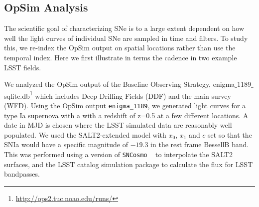
\subsection{OpSim Analysis}
\label{sec:\secname:analysis}
The scientific goal of characterizing SNe is to a large extent dependent
on how well the light curves of individual SNe are sampled in time and
filters. To study this, we re-index the OpSim output on spatial
locations rather than use the temporal index. Here we first illustrate
in terms the cadence in two example LSST fields. 












We analyzed the OpSim output of the Baseline Observing Strategy,
enigma$\_$1189$\_$sqlite.db{\footnote
{\url{http://ops2.tuc.noao.edu/runs/}}} which includes Deep Drilling
Fields (DDF) and the main survey (WFD). Using the OpSim output \texttt{enigma\_1189}, we generated 
light curves for a type Ia supernova with a with a redshift of z=0.5 at a few different
locations. A date in MJD is chosen where the LSST simulated data are
reasonably well populated. We used the SALT2-extended model
with $x_0$, $x_1$ and $c$ set so that the SNIa would have a specific
magnitude of $-19.3$ in the rest frame BessellB band. This was performed
using a version of \texttt{SNCosmo} ~ to interpolate the SALT2 surfaces, and the
LSST catalog simulation package to calculate the flux for LSST
bandpasses. 

